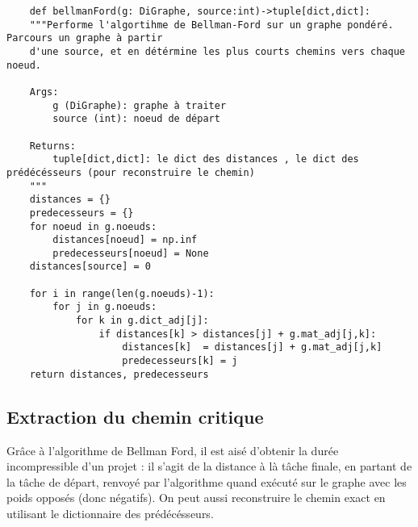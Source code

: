 \documentclass{article}
\begin{document}
\begin{verbatim}
    def bellmanFord(g: DiGraphe, source:int)->tuple[dict,dict]:
    """Performe l'algortihme de Bellman-Ford sur un graphe pondéré. Parcours un graphe à partir 
    d'une source, et en détérmine les plus courts chemins vers chaque noeud.

    Args:
        g (DiGraphe): graphe à traiter
        source (int): noeud de départ

    Returns:
        tuple[dict,dict]: le dict des distances , le dict des prédécésseurs (pour reconstruire le chemin)
    """
    distances = {} 
    predecesseurs = {}
    for noeud in g.noeuds:
        distances[noeud] = np.inf
        predecesseurs[noeud] = None
    distances[source] = 0
    
    for i in range(len(g.noeuds)-1):
        for j in g.noeuds:
            for k in g.dict_adj[j]: 
                if distances[k] > distances[j] + g.mat_adj[j,k]:
                    distances[k]  = distances[j] + g.mat_adj[j,k]
                    predecesseurs[k] = j
    return distances, predecesseurs
\end{verbatim}
\subsection{Extraction du chemin critique}
Grâce à l'algorithme de Bellman Ford, il est aisé d'obtenir la durée incompressible d'un projet :
il s'agit de la distance à là tâche finale, en partant de la tâche de départ, renvoyé par l'algorithme
quand exécuté sur le graphe avec les poids opposés (donc négatifs).
On peut aussi reconstruire le chemin exact en utilisant le dictionnaire des prédécésseurs.
\end{document}
